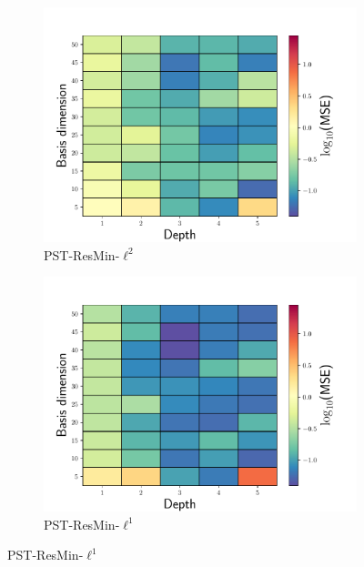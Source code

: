 \documentclass[3p,computermodern,10pt]{elsarticle}
\begin{document}
\begin{figure}
\begin{center}
\begin{subfigure}[t]{0.32\textwidth}
\includegraphics[trim={0cm 0cm 0cm 0cm},clip,width=1.0\linewidth]{code/burgers/synapse_models/basis_study/results/MSE_LS.pdf}
\caption{PST-ResMin-$\ell^2$}
\label{fig:burg_rom_results1}
\end{subfigure}
\begin{subfigure}[t]{0.32\textwidth}
\includegraphics[trim={0cm 0cm 0cm 0cm},clip,width=1.0\linewidth]{code/burgers/synapse_models/basis_study/results/MSE_L1.pdf}
\caption{PST-ResMin-$\ell^1$}
\label{fig:burg_rom_results2}
\end{subfigure}

\end{center}
\end{figure}
\end{document}
